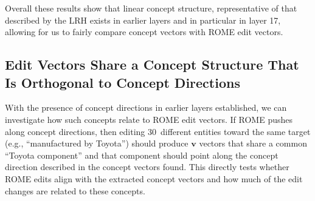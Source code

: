 \documentclass[11pt,a4paper]{article}
\newcommand{\vv}{\mathbf{v}}
\begin{document}
Overall these results show that linear concept structure, representative of that described by the LRH exists in earlier layers and in particular in layer 17, allowing for us to fairly compare concept vectors with ROME edit vectors.







\subsection{Edit Vectors Share a Concept Structure That Is Orthogonal to Concept Directions}
\label{sec:exp1b}

With the presence of concept directions in earlier layers established, we can investigate how such concepts relate to ROME edit vectors. If ROME pushes along concept directions, then editing 30~different entities toward the same target (e.g., ``manufactured by Toyota'') should produce $\vv$ vectors that share a common ``Toyota component'' and that component should point along the concept direction described in the concept vectors found.
This directly tests whether ROME edits align with the extracted concept vectors and how much of the edit changes are related to these concepts.
\end{document}
